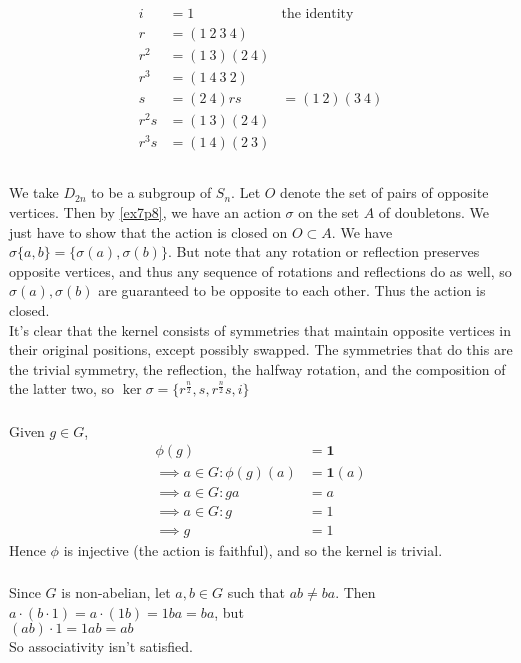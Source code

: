 \documentclass{article}
\newcommand{\set}[1]{ \{ #1 \} }
\newcommand{\id}{ \bm{1} }
\begin{document}
\subsubsection{}\label{ex7p11}
\begin{align*}
i &= 1 & \mbox{the identity}\\
r &= (1\ 2\ 3\ 4)\\
r^2 &= (1\ 3) (2\ 4)\\
r^3 &= (1\ 4\ 3\ 2)\\
s &= (2\ 4)
rs &= (1\ 2)(3\ 4)\\
r^2s &= (1\ 3)(2\ 4)\\
r^3s &= (1\ 4)(2\ 3)\\
\end{align*}
\subsubsection{}\label{ex7p12}
We take $D_{2n}$ to be a subgroup of $S_n$. Let $O$ denote the set of pairs of opposite vertices. Then by \ref{ex7p8}, we have an action $\sigma$ on the set $A$ of doubletons. We just have to show that the action is closed on $O \subset A$. We have $\sigma\set{a,b} = \set{\sigma(a),\sigma(b)}$. But note that any rotation or reflection preserves opposite vertices, and thus any sequence of rotations and reflections do as well, so $\sigma(a),\sigma(b)$ are guaranteed to be opposite to each other. Thus the action is closed.\\
It's clear that the kernel consists of symmetries that maintain opposite vertices in their original positions, except possibly swapped. The symmetries that do this are the trivial symmetry, the reflection, the halfway rotation, and the composition of the latter two, so $\ker\sigma = \set{r^{\frac{n}{2}}, s, r^{\frac{n}{2}}s, i}$
\subsubsection{}\label{ex7p13}
Given $g\in G$,
\begin{align*}
\phi(g) &= \id\\
\implies a\in G: \phi(g)(a) &= \id(a)\\
\implies a\in G: ga &= a\\
\implies a\in G: g&= 1\\
\implies g &= 1
\end{align*}
Hence $\phi$ is injective (the action is faithful), and so the kernel is trivial.
\subsubsection{}\label{ex7p14}
Since $G$ is non-abelian, let $a,b \in G$ such that $ab \neq ba$. Then\\
$a\cdot(b\cdot 1) = a\cdot(1b) = 1ba = ba$, but\\
$(ab)\cdot 1 = 1ab = ab$\\
So associativity isn't satisfied.
\end{document}
